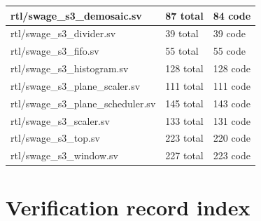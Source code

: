\documentclass[11pt,a4paper]{article}
\begin{document}
{\begin{longtable}{@{}L{0.55\textwidth}|L{0.18\textwidth}|L{0.18\textwidth}@{}}
rtl/\allowbreak{}swage\_\allowbreak{}s3\_\allowbreak{}demosaic.sv & 87 total & 84 code\\[2pt]\hline

rtl/\allowbreak{}swage\_\allowbreak{}s3\_\allowbreak{}divider.sv & 39 total & 39 code\\[2pt]\hline

rtl/\allowbreak{}swage\_\allowbreak{}s3\_\allowbreak{}fifo.sv & 55 total & 55 code\\[2pt]\hline

rtl/\allowbreak{}swage\_\allowbreak{}s3\_\allowbreak{}histogram.sv & 128 total & 128 code\\[2pt]\hline

rtl/\allowbreak{}swage\_\allowbreak{}s3\_\allowbreak{}plane\_\allowbreak{}scaler.sv & 111 total & 111 code\\[2pt]\hline

rtl/\allowbreak{}swage\_\allowbreak{}s3\_\allowbreak{}plane\_\allowbreak{}scheduler.sv & 145 total & 143 code\\[2pt]\hline

rtl/\allowbreak{}swage\_\allowbreak{}s3\_\allowbreak{}scaler.sv & 133 total & 131 code\\[2pt]\hline

rtl/\allowbreak{}swage\_\allowbreak{}s3\_\allowbreak{}top.sv & 223 total & 220 code\\[2pt]\hline

rtl/\allowbreak{}swage\_\allowbreak{}s3\_\allowbreak{}window.sv & 227 total & 223 code\\[2pt]\hline

\bottomrule\end{longtable}}

\section{Verification record index}
\end{document}
